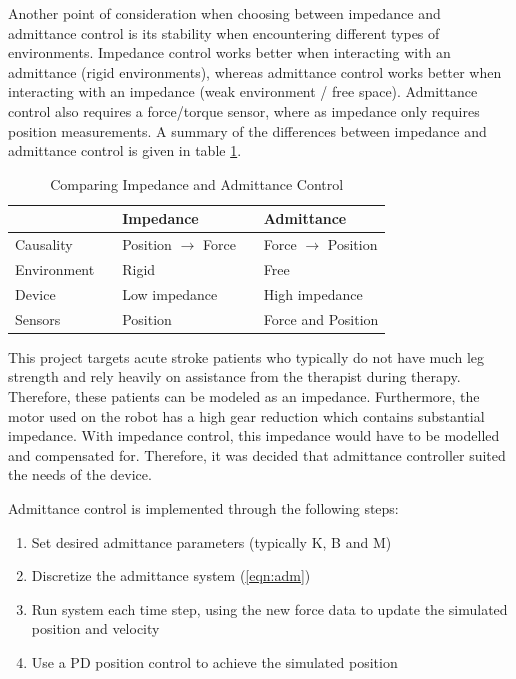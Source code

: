 \documentclass[12pt]{report}
\begin{document}
	Another point of consideration when choosing between impedance and admittance control is its stability when encountering different types of environments. Impedance control works better when interacting with an admittance (rigid environments), whereas admittance control works better when interacting with an impedance (weak environment / free space). Admittance control also requires a force/torque sensor, where as impedance only requires position measurements. A summary of the differences between impedance and admittance control is given in table \ref{tab:imp_vs_adm}.
	
		\begin{table}[h] \label{tab:imp_vs_adm}
	\centering \doublespacing
	\caption{Comparing Impedance and Admittance Control}
	\begin{tabular}{l l l l l}
	\toprule
	& & Impedance & & Admittance \\
	\midrule
	\rowcolor{gray!10} Causality & & Position $\rightarrow$ Force &  & Force $\rightarrow$ Position \\
	Environment & & Rigid & & Free \\
	\rowcolor{gray!10} Device & & Low impedance & & High impedance \\
	Sensors & & Position & & Force and Position \\
	\bottomrule
	\end{tabular}
	\end{table}
	
	This project targets acute stroke patients who typically do not have much leg strength and rely heavily on assistance from the therapist during therapy. Therefore, these patients can be modeled as an impedance. Furthermore, the motor used on the robot has a high gear reduction which contains substantial impedance. With impedance control, this impedance would have to be modelled and compensated for. Therefore, it was decided that admittance controller suited the needs of the device. 
	
Admittance control is implemented through the following steps: 

	\begin{enumerate}
		\item Set desired admittance parameters (typically K, B and M)
		\item Discretize the admittance system (\ref{eqn:adm})
		\item Run system each time step, using the new force data to update the simulated position and velocity 
		\item Use a PD position control to achieve the simulated position
	\end{enumerate}
	
\end{document}
